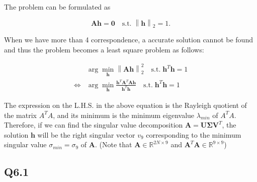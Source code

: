 \documentclass[11pt]{article}
\begin{document}
\newcommand{\norm}[1]{\left\lVert#1\right\rVert}

The problem can be formulated as

\begin{equation}
    \mathbf{Ah} = \mathbf{0} \quad
    \textrm{s.t.} \; \norm{\mathbf{h}}_2 = 1 .
\end{equation}

When we have more than 4 correspondence, a accurate solution cannot be found and thus the problem becomes a least square problem as follows:

\begin{align}
    & \arg\min_{\mathbf{h}} \norm{\mathbf{Ah}}^2_2
    \quad \textrm{s.t.} \; \mathbf{h}^T \mathbf{h} = 1
    \\ \Leftrightarrow
    & \arg\min_{\mathbf{h}}
    \frac{\mathbf{h}^T\mathbf{A}^T\mathbf{A}\mathbf{h}}{\mathbf{h}^T\mathbf{h}}
    \quad \textrm{s.t.} \; \mathbf{h}^T \mathbf{h} = 1
\end{align}

The expression on the L.H.S. in the above equation is the Rayleigh quotient of the matrix $A^T A$, and its minimum is the minimum eigenvalue $\lambda_{min}$ of $A^T A$. Therefore, if we can find the singular value decomposition $\mathbf{A} = \mathbf{U\Sigma V}^T$, the solution $\mathbf{h}$ will be the right singular vector $v_9$ corresponding to the minimum singular value $\sigma_{min}=\sigma_9$ of $\mathbf{A}$. (Note that $\mathbf{A}\in \mathbb{R}^{2N\times 9}$ and $\mathbf{A}^T\mathbf{A}\in \mathbb{R}^{9\times 9}$)

\newpage

\subsection*{Q6.1}
\end{document}
